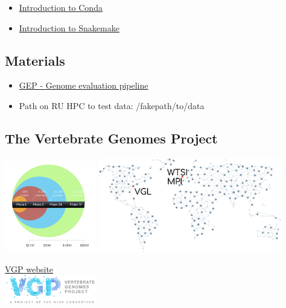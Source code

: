 \documentclass[
]{article}
\providecommand{\tightlist}{%
  \setlength{\itemsep}{0pt}\setlength{\parskip}{0pt}}
\begin{document}
\begin{itemize}
\tightlist
\item
  \href{https://docs.conda.io/projects/conda/en/latest/user-guide/getting-started.html}{Introduction
  to Conda}
\item
  \href{https://snakemake.readthedocs.io/en/stable/}{Introduction to
  Snakemake}
\end{itemize}

\hypertarget{materials}{%
\subsection{Materials}\label{materials}}

\begin{itemize}
\tightlist
\item
  \href{https://git.imp.fu-berlin.de/cmazzoni/genome_evaluation_snakemake}{GEP
  - Genome evaluation pipeline}
\item
  Path on RU HPC to test data: /fakepath/to/data
\end{itemize}

\hypertarget{the-vertebrate-genomes-project}{%
\subsection{The Vertebrate Genomes
Project}\label{the-vertebrate-genomes-project}}

\includegraphics[width=0.3\textwidth,height=\textheight]{../imgs/VGP_phases.png}
\includegraphics[width=0.6\textwidth,height=\textheight]{../imgs/VGP_map.png}

\href{https://vertebrategenomesproject.org/}{VGP website}\\
\includegraphics[width=0.3\textwidth,height=\textheight]{../imgs/VGP_logo.png}
\end{document}
